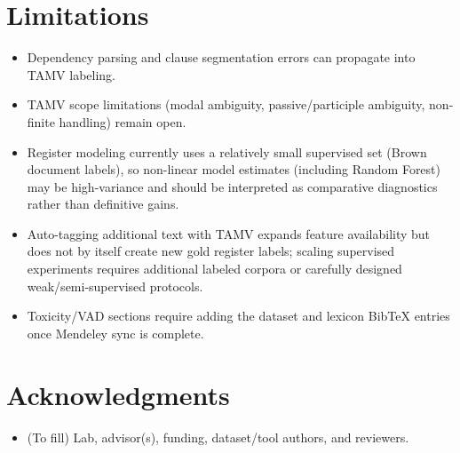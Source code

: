 \documentclass[11pt]{article}
\begin{document}
\section*{Limitations}
\begin{itemize}
  \item Dependency parsing and clause segmentation errors can propagate into TAMV labeling. \citep{Nivre2010DependencyParsing}
  \item TAMV scope limitations (modal ambiguity, passive/participle ambiguity, non-finite handling) remain open. \citep{Ramm2017AnnotatingGerman,DonickeClause-LevelGerman}
  \item Register modeling currently uses a relatively small supervised set (Brown document labels), so non-linear model estimates (including Random Forest) may be high-variance and should be interpreted as comparative diagnostics rather than definitive gains.
  \item Auto-tagging additional text with TAMV expands feature availability but does not by itself create new gold register labels; scaling supervised experiments requires additional labeled corpora or carefully designed weak/semi-supervised protocols.
  \item Toxicity/VAD sections require adding the dataset and lexicon BibTeX entries once Mendeley sync is complete.
\end{itemize}

\section*{Acknowledgments}
\begin{itemize}
  \item (To fill) Lab, advisor(s), funding, dataset/tool authors, and reviewers.
\end{itemize}


\end{document}

